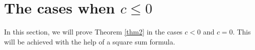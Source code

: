 \documentclass{amsart}
\newtheorem{lemma}{Lemma}
\newtheorem*{definition}{Definition}
\begin{document}







\vspace{0.3cm}

\section{The cases when $c\leq 0$}

In this section, we will prove Theorem \ref{thm2} in the cases $c<0$ and $c=0$. This will be achieved with the help of a square sum formula.
\end{document}
